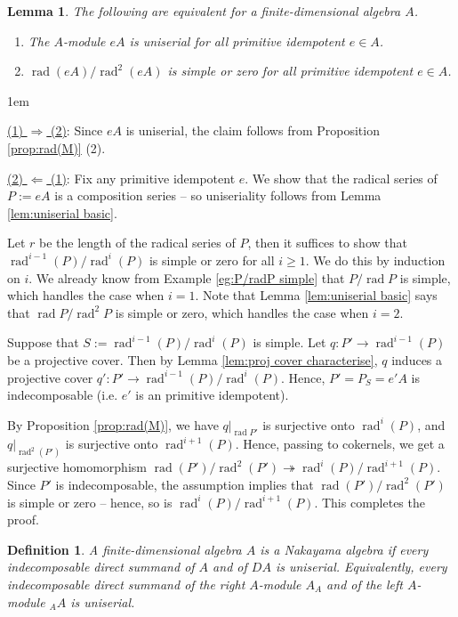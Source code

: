 \documentclass[11pt,a4paper]{article}
\makeatletter
\numberwithin{equation}{section}
\renewenvironment{proof}[1][\proofname]{\par
    \pushQED{\qed}%
    \normalfont \topsep0\p@\@plus6\p@ \labelsep1em\relax
    \trivlist
    \item[\hskip\labelsep\indent
        \bfseries #1]\ignorespaces
    \mbox{}
}{
    \popQED\endtrivlist\@endpefalse
}
\theoremstyle{all}
\newtheorem{lemma}[theorem]{Lemma}
\newtheorem{definition}[theorem]{Definition}
\theoremstyle{remark}
\newcommand{\rad}{\operatorname{rad}\nolimits}
\newcommand{\defn}[1]{\textsl{\color{darkblue} #1}}
\makeatother
\begin{document}
\begin{lemma}\label{lem:uniserial projective<=>cyclic/linear quiver}
The following are equivalent for a finite-dimensional algebra $A$.
\begin{enumerate}
\item The $A$-module $eA$ is uniserial for all primitive idempotent $e\in A$. 

\item $\rad(eA)/\rad^2(eA)$ is simple or zero for all primitive idempotent $e\in A$.
\end{enumerate}
\end{lemma}
\begin{proof}
\underline{(1) $\Rightarrow$ (2)}:  Since $eA$ is uniserial, the claim follows from Proposition \ref{prop:rad(M)} (2).

\underline{(2) $\Leftarrow$ (1)}:  Fix any primitive idempotent $e$. We show that the radical series of $P:=eA$ is a composition series -- so uniseriality follows from Lemma \ref{lem:uniserial basic}.

Let $r$ be the length of the radical series of $P$, then it suffices to show that $\rad^{i-1}(P)/\rad^i(P)$ is simple or zero for all $i \ge 1$.  We do this by induction on $i$.  We already know from Example \ref{eg:P/radP simple} that $P/\rad P$ is simple, which handles the case when $i=1$.  Note that Lemma \ref{lem:uniserial basic} says that $\rad P/\rad^2 P$ is simple or zero, which handles the case when $i=2$.  

Suppose that $S:=\rad^{i-1}(P)/\rad^i(P)$ is simple.
Let $q:P'\to \rad^{i-1}(P)$ be a projective cover.
Then by Lemma \ref{lem:proj cover characterise}, $q$ induces a projective cover $q':P'\to \rad^{i-1}(P)/\rad^i(P)$.  Hence, $P' = P_S = e'A$ is indecomposable (i.e. $e'$ is an primitive idempotent).

By Proposition \ref{prop:rad(M)}, we have $q|_{\rad P'}$ is surjective onto $\rad^i(P)$, and $q|_{\rad^2(P')}$ is surjective onto $\rad^{i+1}(P)$.
Hence, passing to cokernels, we get a surjective homomorphism
$\rad(P')/\rad^2(P')\twoheadrightarrow \rad^i(P)/\rad^{i+1}(P)$.
Since $P'$ is indecomposable, the assumption implies that $\rad (P')/\rad^2 (P')$ is simple or zero -- hence, so is $\rad^i(P)/\rad^{i+1}(P)$.  This completes the proof.
\end{proof}

\begin{definition}
A finite-dimensional algebra $A$ is a \defn{Nakayama algebra} if every indecomposable direct summand of $A$ and of $DA$ is uniserial.
Equivalently, every indecomposable direct summand of the right $A$-module $A_A$ and of the left $A$-module ${}_AA$ is uniserial.
\end{definition}
\end{document}
